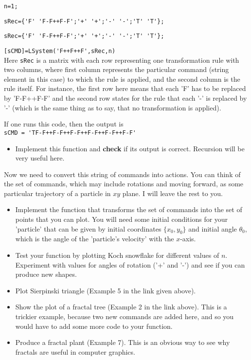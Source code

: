 \documentclass[letterpaper]{article}
\begin{document}
\verb|n=1;|

\verb|sRec={'F' 'F-F++F-F';'+' '+';'-' '-';'T' 'T'};|

\verb|sRec={'F' 'F-F++F-F';'+' '+';'-' '-';'T' 'T'};|

\verb|[sCMD]=LSystem('F++F++F',sRec,n)|\\

Here \verb|sRec| is a matrix with each row representing one transformation rule with two columns, where first column represents the particular command (string element in this case) to which the rule is applied, and the second column is the rule itself. For instance, the first row here means that each 'F' has to be replaced by 'F-F++F-F' and the second row states for the rule that each '-' is replaced by '-' (which is the same thing as to say, that no transformation is applied).

If one runs this code, then the output is \\

\verb|sCMD = 'TF-F++F-F++F-F++F-F++F-F++F-F'|\\

\begin{itemize}
\item Implement this function and \textbf{check} if its output is correct. Recursion will be very useful here.
\end{itemize}

Now we need to convert this string of commands into actions. You can think of the set of commands, which may include rotations and moving forward, as some particular trajectory of a particle in $xy$ plane. I will leave the rest to you. 

\begin{itemize}
\item Implement the function that transforms the set of commands into the set of points that you can plot. You will need some initial conditions for your 'particle' that can be given by initial coordinates $\{x_{0},y_{0}\}$ and initial angle $\theta_0$, which is the angle of the 'particle's velocity' with the $x$-axis.
\item Test your function by plotting Koch snowflake for different values of $n$. Experiment with values for angles of rotation ('+' and '-') and see if you can produce new shapes.
\item Plot Sierpinski triangle (Example 5 in the link given above). 
\item Show the plot of a fractal tree (Example 2 in the link above). This is a trickier example, because two new commands are added here, and so you would have to add some more code to your function.
\item Produce a fractal plant (Example 7). This is an obvious way to see why fractals are useful in computer graphics.
\end{itemize}
\end{document}
